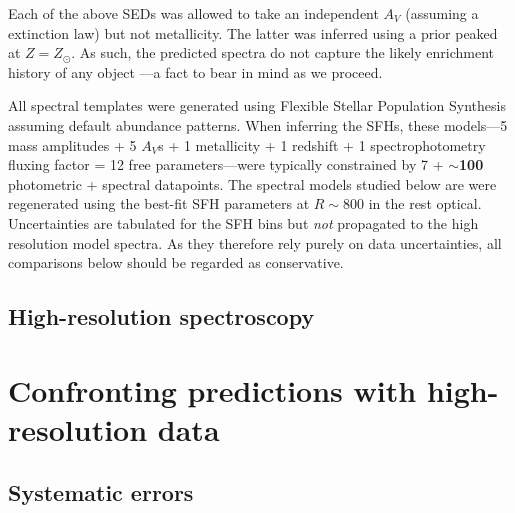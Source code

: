 \documentclass[a4paper,fleqn,usenatbib]{mnras}
\newcommand{\bfr}{\bf\color{red}}
\begin{document}
Each of the above SEDs was allowed to take an independent $A_{V}$ (assuming a \citealt{Calzetti00} 
extinction law) but not metallicity. The latter was inferred using a prior peaked at $Z=Z_{\odot}$. As such,
the predicted spectra do not capture the likely enrichment history of any object 
\citep[cf.][]{Pacifici12, Morishita19}---a fact to bear in mind as we proceed.

All spectral templates were generated using Flexible Stellar Population Synthesis 
\citep[FSPS;][]{ConroyGunnWhite09} assuming default abundance patterns. When inferring the SFHs, 
these models---5 mass amplitudes + 5 $A_{V}$s + 1 metallicity + 1 redshift + 1 spectrophotometry fluxing 
factor = 12 free parameters---were typically constrained by 7 + {\bfr $\sim$100} photometric + spectral 
datapoints. The spectral models studied below are were regenerated using the best-fit SFH parameters
at $R\sim800$ in the rest optical. Uncertainties are tabulated for the SFH bins but {\it not} propagated
to the high resolution model spectra. As they therefore rely purely on data uncertainties, all comparisons 
below should be regarded as conservative.

\subsection{High-resolution spectroscopy}
\label{sec: hiRes}




\section{Confronting predictions with high-resolution data}
\label{sec:results}

\subsection{Systematic errors}
\label{sec:systematics}


\end{document}

